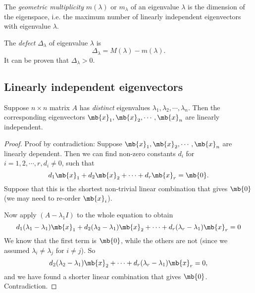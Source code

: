 \documentclass[a4paper]{article}
\begin{document}
\begin{defi}
  The \emph{geometric multiplicity} $m(\lambda)$ or $m_\lambda$ of an eigenvalue $\lambda$ is the dimension of the eigenspace, i.e. the maximum number of linearly independent eigenvectors with eigenvalue $\lambda$.
\end{defi}

\begin{defi}
  The \emph{defect} $\Delta_\lambda$ of eigenvalue $\lambda$ is
  \[
  \Delta_\lambda = M(\lambda) - m(\lambda).
  \]
  It can be proven that $\Delta_\lambda > 0$.
\end{defi}

\subsection{Linearly independent eigenvectors}
\begin{thm}
  Suppose $n\times n$ matrix $A$ has \emph{distinct} eigenvalues $\lambda_1, \lambda_2, \cdots, \lambda_n$. Then the corresponding eigenvectors $\mb{x}_1, \mb{x}_2, \cdots, \mb{x}_n$ are linearly independent.
\end{thm}

\begin{proof}
  Proof by contradiction: Suppose $\mb{x}_1, \mb{x}_2, \cdots, \mb{x}_n$ are linearly dependent. Then we can find non-zero constants $d_i$ for $i = 1, 2, \cdots, r, d_i\not= 0$, such that
  \[
  d_1\mb{x}_1 + d_2\mb{x}_2 + \cdots + d_r\mb{x}_r = \mb{0}.
  \]
  Suppose that this is the shortest non-trivial linear combination that gives $\mb{0}$ (we may need to re-order $\mb{x}_i$).

  Now apply $(A - \lambda_1 I)$ to the whole equation to obtain
  \[
  d_1(\lambda_1 - \lambda_1)\mb{x}_1 + d_2(\lambda_2 - \lambda_1)\mb{x}_2 + \cdots + d_r(\lambda_r - \lambda_1)\mb{x}_r = 0
  \]
  We know that the first term is $\mb{0}$, while the others are not (since we assumed $\lambda_i \not= \lambda_j$ for $i\not= j$). So
  \[
  d_2(\lambda_2 - \lambda_1)\mb{x}_2 + \cdots + d_r(\lambda_r - \lambda_1)\mb{x}_r = 0,
  \]
  and we have found a shorter linear combination that gives $\mb{0}$. Contradiction.
\end{proof}
\end{document}
